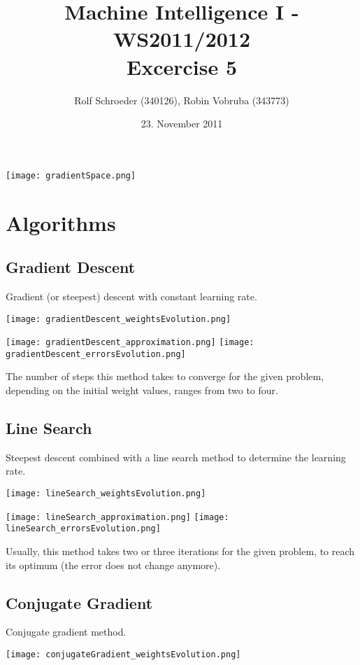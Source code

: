 \documentclass[a4paper,headings=small]{scrartcl}
\title{Machine Intelligence I - WS2011/2012\\Excercise 5}
\author{Rolf Schroeder (340126), Robin Vobruba (343773)}
\date{23. November 2011}
\numberwithin{equation}{section} %
\numberwithin{figure}{section}   %
\begin{document}
\maketitle

\texttt{[image: gradientSpace.png]}


\newpage
\section{Algorithms}


\subsection{Gradient Descent}

Gradient (or steepest) descent with constant learning rate.

\texttt{[image: gradientDescent\_weightsEvolution.png]}

\texttt{[image: gradientDescent\_approximation.png]}
\texttt{[image: gradientDescent\_errorsEvolution.png]}

The number of steps this method takes to converge for the given problem,
depending on the initial weight values, ranges from two to four.


\newpage
\subsection{Line Search}

Steepest descent combined with a line search method to determine the learning rate.

\texttt{[image: lineSearch\_weightsEvolution.png]}

\texttt{[image: lineSearch\_approximation.png]}
\texttt{[image: lineSearch\_errorsEvolution.png]}

Usually, this method takes two or three iterations for the given problem,
to reach its optimum (the error does not change anymore).


\newpage
\subsection{Conjugate Gradient}

Conjugate gradient method.

\texttt{[image: conjugateGradient\_weightsEvolution.png]}
\end{document}
